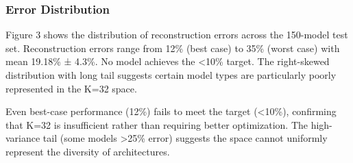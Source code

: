 \subsubsection{Error Distribution}

Figure 3 shows the distribution of reconstruction errors across the 150-model test set. Reconstruction errors range from 12\% (best case) to 35\% (worst case) with mean 19.18\% ± 4.3\%. No model achieves the <10\% target. The right-skewed distribution with long tail suggests certain model types are particularly poorly represented in the K=32 space.

Even best-case performance (12\%) fails to meet the target (<10\%), confirming that K=32 is insufficient rather than requiring better optimization. The high-variance tail (some models >25\% error) suggests the space cannot uniformly represent the diversity of architectures.
